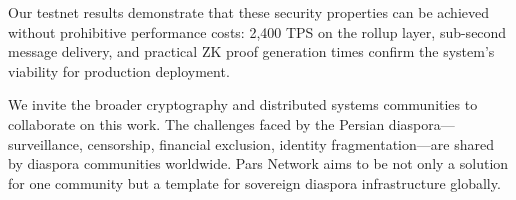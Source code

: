 \documentclass[11pt,a4paper]{article}
\begin{document}
Our testnet results demonstrate that these security properties can be achieved without prohibitive performance costs: 2{,}400 TPS on the rollup layer, sub-second message delivery, and practical ZK proof generation times confirm the system's viability for production deployment.

We invite the broader cryptography and distributed systems communities to collaborate on this work. The challenges faced by the Persian diaspora---surveillance, censorship, financial exclusion, identity fragmentation---are shared by diaspora communities worldwide. Pars Network aims to be not only a solution for one community but a template for sovereign diaspora infrastructure globally.

\end{document}
